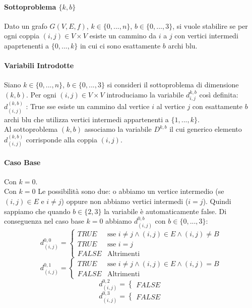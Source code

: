 \documentclass[12pt, a4paper, openany]{book}
\begin{document}
\paragraph*{Sottoproblema $\{k,b\}$}
Dato un grafo $G(V,E,f)$, $k\in \{0,...,n\}$, $b\in \{0,...,3\}$, si vuole stabilire se per ogni coppia $(i,j)\in V\times V$
esiste un cammino da $i$ a $j$ con vertici intermedi apaprtenenti a $\{0,...,k\}$ in cui ci sono esattamente $b$ archi blu.

\paragraph*{Variabili Introdotte}
Siano $k\in \{0,...,n\}$, $b\in \{0,...,3\}$ si consideri il sottoproblema di dimensione $(k,b)$.
Per ogni $(i,j)\in V\times V$ introduciamo la variabile $d_{i,j}^{k,b}$ così definita:
\\$d_{(i,j)}^{(k,b)}$ : True sse esiste un cammino dal vertice $i$ al vertice $j$ con esattamente $b$ archi blu
che utilizza vertici intermedi appartenenti a $\{1,...,k\}$.
\\Al sottoproblema $(k,b)$ associamo la variabile $D^{k,b}$ il cui generico elemento $d^{(k,b)}_{(i,j)}$ corrisponde alla coppia $(i,j)$.

\paragraph*{Caso Base} Con $k=0$.
\\Con $k=0$ Le possibilità sono due: o abbiamo un vertice intermedio (se $(i,j)\in E$ e $i\neq j$) oppure non abbiamo vertici intermedi ($i=j$).
Quindi sappiamo che quando $b\in\{2,3\}$ la variabile è automaticamente false. Di conseguenza nel caso base $k=0$ abbiamo $d_{(i,j)}^{0,b}$ con $b\in \{0,...,3\}$:
$$
d_{(i,j)}^{0,0}= \begin{cases}
	TRUE & \text{sse } i\neq j \wedge (i,j)\in E \wedge (i,j) \neq B\\
	TRUE & \text{sse } i=j \\
	FALSE & \text{Altrimenti}
\end{cases}
$$
$$
d_{(i,j)}^{0,1}= \begin{cases}
	TRUE & \text{sse } i\neq j \wedge (i,j)\in E \wedge (i,j) = B\\
	FALSE & \text{Altrimenti}
\end{cases}
$$
$$
d_{(i,j)}^{0,2}= \begin{cases}
	FALSE
\end{cases}
$$
$$
d_{(i,j)}^{0,3}= \begin{cases}
	FALSE
\end{cases}
$$
\end{document}
